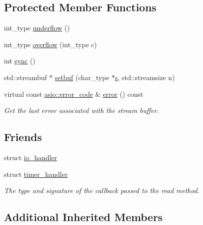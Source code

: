 \subsection*{Protected Member Functions}
\begin{DoxyCompactItemize}
\item 
int\+\_\+type \hyperlink{classasio_1_1basic__socket__streambuf_af21c3dcbf5e848a9a76e81bf6d0345a1}{underflow} ()
\item 
int\+\_\+type \hyperlink{classasio_1_1basic__socket__streambuf_a057b5e8b943d8110947f3a956f6d278c}{overflow} (int\+\_\+type c)
\item 
int \hyperlink{classasio_1_1basic__socket__streambuf_a9381fb6bfc2d23f84eda0cca1108c31c}{sync} ()
\item 
std\+::streambuf $\ast$ \hyperlink{classasio_1_1basic__socket__streambuf_aa9e8c6458a18ca91a010dd26e3bc7317}{setbuf} (char\+\_\+type $\ast$\hyperlink{group__async__connect_ga31ab74b9ea6c77932dddd016cfc7920a}{s}, std\+::streamsize n)
\item 
virtual const \hyperlink{classasio_1_1error__code}{asio\+::error\+\_\+code} \& \hyperlink{classasio_1_1basic__socket__streambuf_a2b6c64566f37b58fc6535505ab0215c0}{error} () const 
\begin{DoxyCompactList}\small\item\em Get the last error associated with the stream buffer. \end{DoxyCompactList}\end{DoxyCompactItemize}
\subsection*{Friends}
\begin{DoxyCompactItemize}
\item 
struct \hyperlink{classasio_1_1basic__socket__streambuf_a4fdedeb697c55e609e40a2a45ac6d5d2}{io\+\_\+handler}
\item 
struct \hyperlink{classasio_1_1basic__socket__streambuf_aa9ecc4ed02f4f2038c1d97ab84a62aa1}{timer\+\_\+handler}
\begin{DoxyCompactList}\small\item\em The type and signature of the callback passed to the read method. \end{DoxyCompactList}\end{DoxyCompactItemize}
\subsection*{Additional Inherited Members}


